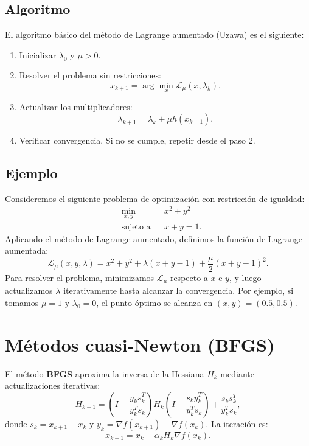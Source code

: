 \documentclass[12pt]{book}
\theoremstyle{definition}
\theoremstyle{plain}
\theoremstyle{remark}
\begin{document}
\subsection{Algoritmo}

El algoritmo básico del método de Lagrange aumentado (Uzawa) es el siguiente:

\begin{enumerate}
    \item Inicializar $\lambda_0$ y $\mu > 0$.
    \item Resolver el problema sin restricciones:
    \begin{equation*}
        x_{k+1} = \arg\min_{x} \mathcal{L}_\mu(x, \lambda_k).
    \end{equation*}
    \item Actualizar los multiplicadores:
    \begin{equation*}
        \lambda_{k+1} = \lambda_k + \mu h(x_{k+1}).
    \end{equation*}
    \item Verificar convergencia. Si no se cumple, repetir desde el paso 2.
\end{enumerate}

\subsection{Ejemplo}

Consideremos el siguiente problema de optimización con restricción de igualdad:
\begin{equation*}
    \begin{aligned}
        & \min_{x,y} & & x^2 + y^2 \\
        & \text{sujeto a} & & x + y = 1.
    \end{aligned}
\end{equation*}
Aplicando el método de Lagrange aumentado, definimos la función de Lagrange aumentada:
\begin{equation*}
    \mathcal{L}_\mu(x, y, \lambda) = x^2 + y^2 + \lambda (x + y - 1) + \frac{\mu}{2} (x + y - 1)^2.
\end{equation*}
Para resolver el problema, minimizamos $\mathcal{L}_\mu$ respecto a $x$ e $y$, y luego actualizamos $\lambda$ iterativamente hasta alcanzar la convergencia.
\noindent Por ejemplo, si tomamos $\mu = 1$ y $\lambda_0 = 0$, el punto óptimo se alcanza en $(x, y) = (0.5, 0.5)$.

\section{Métodos cuasi-Newton (BFGS)}
El método \textbf{BFGS} aproxima la inversa de la Hessiana \( H_k \) mediante actualizaciones iterativas:
\[
H_{k+1} = \left( I - \frac{y_k s_k^T}{y_k^T s_k} \right) H_k \left( I - \frac{s_k y_k^T}{y_k^T s_k} \right) + \frac{s_k s_k^T}{y_k^T s_k},
\]
donde \( s_k = x_{k+1} - x_k \) y \( y_k = \nabla f(x_{k+1}) - \nabla f(x_k) \). La iteración es:
\[
x_{k+1} = x_k - \alpha_k H_k \nabla f(x_k).
\]
\end{document}
